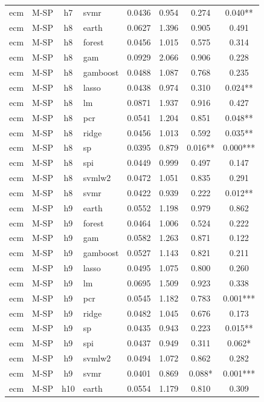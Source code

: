 \begin{ThreePartTable}
\begin{longtable}[t]{llclcccc}
ecm & M-SP & h7 & svmr & 0.0436 & 0.954 & 0.274 & 0.040**\\
\addlinespace
ecm & M-SP & h8 & earth & 0.0627 & 1.396 & 0.905 & 0.491\\
ecm & M-SP & h8 & forest & 0.0456 & 1.015 & 0.575 & 0.314\\
ecm & M-SP & h8 & gam & 0.0929 & 2.066 & 0.906 & 0.228\\
ecm & M-SP & h8 & gamboost & 0.0488 & 1.087 & 0.768 & 0.235\\
ecm & M-SP & h8 & lasso & 0.0438 & 0.974 & 0.310 & 0.024**\\
ecm & M-SP & h8 & lm & 0.0871 & 1.937 & 0.916 & 0.427\\
ecm & M-SP & h8 & pcr & 0.0541 & 1.204 & 0.851 & 0.048**\\
ecm & M-SP & h8 & ridge & 0.0456 & 1.013 & 0.592 & 0.035**\\
ecm & M-SP & h8 & sp & 0.0395 & 0.879 & 0.016** & 0.000***\\
ecm & M-SP & h8 & spi & 0.0449 & 0.999 & 0.497 & 0.147\\
ecm & M-SP & h8 & svmlw2 & 0.0472 & 1.051 & 0.835 & 0.291\\
ecm & M-SP & h8 & svmr & 0.0422 & 0.939 & 0.222 & 0.012**\\
\addlinespace
ecm & M-SP & h9 & earth & 0.0552 & 1.198 & 0.979 & 0.862\\
ecm & M-SP & h9 & forest & 0.0464 & 1.006 & 0.524 & 0.222\\
ecm & M-SP & h9 & gam & 0.0582 & 1.263 & 0.871 & 0.122\\
ecm & M-SP & h9 & gamboost & 0.0527 & 1.143 & 0.821 & 0.211\\
ecm & M-SP & h9 & lasso & 0.0495 & 1.075 & 0.800 & 0.260\\
ecm & M-SP & h9 & lm & 0.0695 & 1.509 & 0.923 & 0.338\\
ecm & M-SP & h9 & pcr & 0.0545 & 1.182 & 0.783 & 0.001***\\
ecm & M-SP & h9 & ridge & 0.0482 & 1.045 & 0.676 & 0.173\\
ecm & M-SP & h9 & sp & 0.0435 & 0.943 & 0.223 & 0.015**\\
ecm & M-SP & h9 & spi & 0.0437 & 0.949 & 0.311 & 0.062*\\
ecm & M-SP & h9 & svmlw2 & 0.0494 & 1.072 & 0.862 & 0.282\\
ecm & M-SP & h9 & svmr & 0.0401 & 0.869 & 0.088* & 0.001***\\
\addlinespace
ecm & M-SP & h10 & earth & 0.0554 & 1.179 & 0.810 & 0.309\\

\end{longtable}
\end{ThreePartTable}
